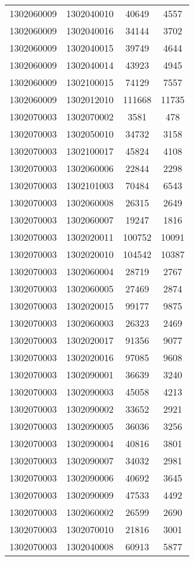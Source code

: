 \begin{longtable}[h]{llcc}
		1302060009 & 1302040010 & 40649 & 4557\\
		1302060009 & 1302040016 & 34144 & 3702\\
		1302060009 & 1302040015 & 39749 & 4644\\
		1302060009 & 1302040014 & 43923 & 4945\\
		1302060009 & 1302100015 & 74129 & 7557\\
		1302060009 & 1302012010 & 111668 & 11735\\
		1302070003 & 1302070002 & 3581 & 478\\
		1302070003 & 1302050010 & 34732 & 3158\\
		1302070003 & 1302100017 & 45824 & 4108\\
		1302070003 & 1302060006 & 22844 & 2298\\
		1302070003 & 1302101003 & 70484 & 6543\\
		1302070003 & 1302060008 & 26315 & 2649\\
		1302070003 & 1302060007 & 19247 & 1816\\
		1302070003 & 1302020011 & 100752 & 10091\\
		1302070003 & 1302020010 & 104542 & 10387\\
		1302070003 & 1302060004 & 28719 & 2767\\
		1302070003 & 1302060005 & 27469 & 2874\\
		1302070003 & 1302020015 & 99177 & 9875\\
		1302070003 & 1302060003 & 26323 & 2469\\
		1302070003 & 1302020017 & 91356 & 9077\\
		1302070003 & 1302020016 & 97085 & 9608\\
		1302070003 & 1302090001 & 36639 & 3240\\
		1302070003 & 1302090003 & 45058 & 4213\\
		1302070003 & 1302090002 & 33652 & 2921\\
		1302070003 & 1302090005 & 36036 & 3256\\
		1302070003 & 1302090004 & 40816 & 3801\\
		1302070003 & 1302090007 & 34032 & 2981\\
		1302070003 & 1302090006 & 40692 & 3645\\
		1302070003 & 1302090009 & 47533 & 4492\\
		1302070003 & 1302060002 & 26599 & 2690\\
		1302070003 & 1302070010 & 21816 & 3001\\
		1302070003 & 1302040008 & 60913 & 5877\\

\end{longtable}
